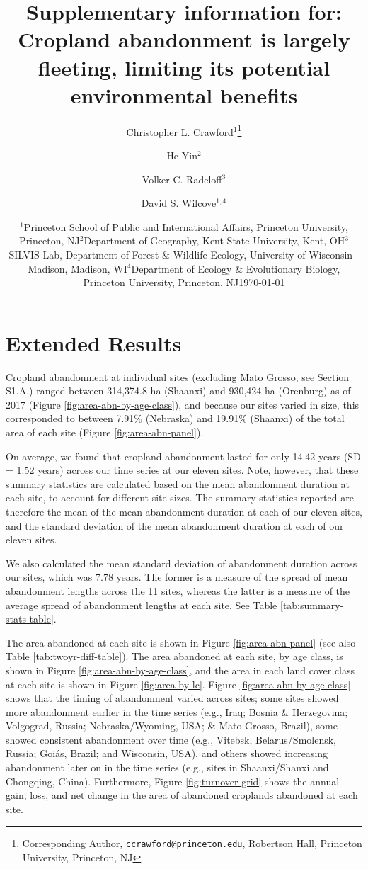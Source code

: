 \documentclass[
]{article}
\title{Supplementary information for: Cropland abandonment is largely fleeting, limiting its potential environmental benefits}
\author{Christopher L. Crawford\(^1\)\footnote{Corresponding Author, \href{mailto:ccrawford@princeton.edu}{\nolinkurl{ccrawford@princeton.edu}}, Robertson Hall, Princeton University, Princeton, NJ} \and He Yin\(^2\) \and Volker C. Radeloff\(^3\) \and David S. Wilcove\(^{1,4}\)}
\date{\(^1\)Princeton School of Public and International Affairs, Princeton University, Princeton, NJ\newline \(^2\)Department of Geography, Kent State University, Kent, OH\newline \(^3\)SILVIS Lab, Department of Forest \& Wildlife Ecology, University of Wisconsin - Madison, Madison, WI\newline \(^4\)Department of Ecology \& Evolutionary Biology, Princeton University, Princeton, NJ\newline \newline \today}
\newcommand{\beginsupplement}{
	\setcounter{figure}{0} 
	\setcounter{section}{0} 
	\setcounter{table}{0} 
	\setcounter{equation}{0} 

	\renewcommand{\thefigure}{S\arabic{figure}} 
	\renewcommand{\thesection}{S\arabic{section}} 
	\renewcommand{\thetable}{S\arabic{table}} 
	\renewcommand\theequation{S\arabic{equation}}
	}
\begin{document}
\maketitle

{
\hypersetup{linkcolor=}
\setcounter{tocdepth}{2}
\tableofcontents
}
\beginsupplement

\listoftables
\listoffigures

\newpage

\hypertarget{results-si}{%
\section{Extended Results}\label{results-si}}

Cropland abandonment at individual sites (excluding Mato Grosso, see Section S1.A.) ranged between 314,374.8 ha (Shaanxi) and 930,424 ha (Orenburg) as of 2017 (Figure \ref{fig:area-abn-by-age-class}), and because our sites varied in size, this corresponded to between 7.91\% (Nebraska) and 19.91\% (Shaanxi) of the total area of each site (Figure \ref{fig:area-abn-panel}).

On average, we found that cropland abandonment lasted for only 14.42 years (SD = 1.52 years) across our time series at our eleven sites.
Note, however, that these summary statistics are calculated based on the mean abandonment duration at each site, to account for different site sizes.
The summary statistics reported are therefore the mean of the mean abandonment duration at each of our eleven sites, and the standard deviation of the mean abandonment duration at each of our eleven sites.

We also calculated the mean standard deviation of abandonment duration across our sites, which was 7.78 years.
The former is a measure of the spread of mean abandonment lengths across the 11 sites, whereas the latter is a measure of the average spread of abandonment lengths at each site.
See Table \ref{tab:summary-stats-table}.

The area abandoned at each site is shown in Figure \ref{fig:area-abn-panel} (see also Table \ref{tab:twoyr-diff-table}).
The area abandoned at each site, by age class, is shown in Figure \ref{fig:area-abn-by-age-class}, and the area in each land cover class at each site is shown in Figure \ref{fig:area-by-lc}.
Figure \ref{fig:area-abn-by-age-class} shows that the timing of abandonment varied across sites; some sites showed more abandonment earlier in the time series (e.g., Iraq; Bosnia \& Herzegovina; Volgograd, Russia; Nebraska/Wyoming, USA; \& Mato Grosso, Brazil), some showed consistent abandonment over time (e.g., Vitebsk, Belarus/Smolensk, Russia; Goiás, Brazil; and Wisconsin, USA), and others showed increasing abandonment later on in the time series (e.g., sites in Shaanxi/Shanxi and Chongqing, China).
Furthermore, Figure \ref{fig:turnover-grid} shows the annual gain, loss, and net change in the area of abandoned croplands abandoned at each site.
\end{document}
